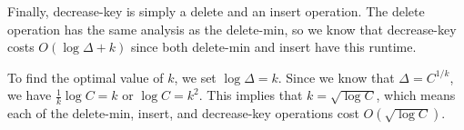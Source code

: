 \documentclass[psamsfonts]{amsart}
\newenvironment{sol}{\vspace{0.25cm}{\large \bfseries Solution:}}{\qedsymbol}
\begin{document}
\begin{sol}
Finally, decrease-key is simply a delete and an insert operation. The delete operation has the same analysis as the delete-min, so we know that decrease-key costs $O(\log \Delta + k)$ since both delete-min and insert have this runtime. 

To find the optimal value of $k$, we set $\log \Delta = k$. Since we know that $\Delta = C^{1/k}$, we have $\frac{1}{k} \log C = k$ or $\log C = k^2$. This implies that $k = \sqrt{\log C}$, which means each of the delete-min, insert, and decrease-key operations cost $O(\sqrt{\log C})$. 
\end{sol}
\end{document}
